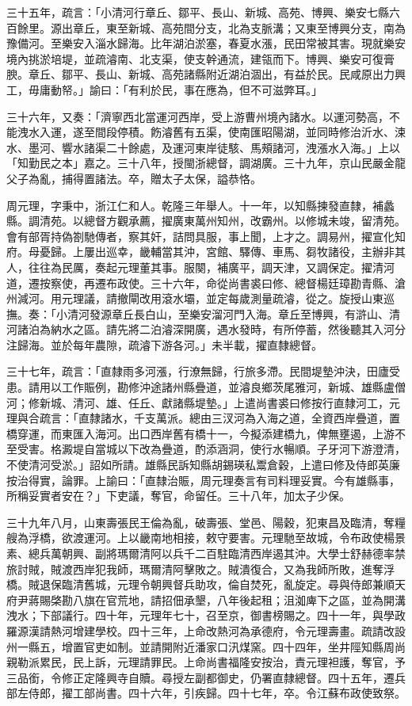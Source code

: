 \begin{pinyinscope}
三十五年，疏言：「小清河行章丘、鄒平、長山、新城、高苑、博興、樂安七縣六百餘里。源出章丘，東至新城、高苑間分支，北為支脈溝；又東至博興分支，南為豫備河。至樂安入淄水歸海。比年湖泊淤塞，春夏水漲，民田常被其害。現就樂安境內挑淤培堤，並疏濬南、北支渠，使支幹通流，建瓴而下。博興、樂安可復膏腴。章丘、鄒平、長山、新城、高苑諸縣附近湖泊涸出，有益於民。民咸原出力興工，毋庸動帑。」諭曰：「有利於民，事在應為，但不可滋弊耳。」

三十六年，又奏：「濟寧西北當運河西岸，受上游曹州境內諸水。以運河勢高，不能洩水入運，遂至間段停積。飭濬舊有五渠，使南匯昭陽湖，並同時修治沂水、涑水、墨河、響水諸渠二十餘處，及運河東岸徒駭、馬頰諸河，洩漲水入海。」上以「知勤民之本」嘉之。三十八年，授閩浙總督，調湖廣。三十九年，京山民嚴金龍父子為亂，捕得置諸法。卒，贈太子太保，謚恭恪。

周元理，字秉中，浙江仁和人。乾隆三年舉人。十一年，以知縣揀發直隸，補蠡縣。調清苑。以總督方觀承薦，擢廣東萬州知州，改霸州。以修城未竣，留清苑。會有部胥持偽劄馳傳者，察其奸，詰問具服，事上聞，上才之。調易州，擢宣化知府。母憂歸。上屢出巡幸，畿輔當其沖，宮館、驛傳、車馬、芻牧諸役，主辦非其人，往往為民厲，奏起元理董其事。服闋，補廣平，調天津，又調保定。擢清河道，遷按察使，再遷布政使。三十六年，命從尚書裘曰修、總督楊廷璋勘青縣、滄州減河。用元理議，請撤閘改用滾水壩，並定每歲測量疏濬，從之。旋授山東巡撫。奏：「小清河發源章丘長白山，至樂安溜河門入海。章丘至博興，有滸山、清河諸泊為納水之區。請先將二泊濬深開廣，遇水發時，有所停蓄，然後聽其入河分注歸海。並於每年農隙，疏濬下游各河。」未半載，擢直隸總督。

三十七年，疏言：「直隸雨多河漲，行潦無歸，行旅多滯。民間堤墊沖決，田廬受患。請用以工作賑例，勘修沖途諸州縣疊道，並濬良鄉茨尾雅河，新城、雄縣盧僧河；修新城、清河、雄、任丘、獻諸縣堤墊。」上遣尚書裘曰修按行直隸河工，元理與合疏言：「直隸諸水，千支萬派。總由三汊河為入海之道，全資西岸疊道，置橋穿運，而東匯入海河。出口西岸舊有橋十一，今擬添建橋九，俾無壅遏，上游不至受害。格澱堤自當城以下改為疊道，酌添涵洞，使行水暢順。子牙河下游澄清，不使清河受淤。」詔如所請。雄縣民訴知縣胡錫瑛私鬻倉穀，上遣曰修及侍郎英廉按治得實，論罪。上諭曰：「直隸治賑，周元理奏言有司料理妥實。今有雄縣事，所稱妥實者安在？」下吏議，奪官，命留任。三十八年，加太子少保。

三十九年八月，山東壽張民王倫為亂，破壽張、堂邑、陽穀，犯東昌及臨清，奪糧艘為浮橋，欲渡運河。上以畿南地相接，敕守要害。元理馳至故城，令布政使楊景素、總兵萬朝興、副將瑪爾清阿以兵千二百駐臨清西岸遏其沖。大學士舒赫德率禁旅討賊，賊渡西岸犯我師，瑪爾清阿擊敗之。賊潰復合，又為我師所敗，進奪浮橋。賊退保臨清舊城，元理令朝興督兵助攻，倫自焚死，亂旋定。尋與侍郎兼順天府尹蔣賜棨勘八旗在官荒地，請招佃承墾，八年後起租；沮洳庳下之區，並為開溝洩水；下部議行。四十年，元理年七十，召至京，御書榜賜之。四十一年，與學政羅源漢請熱河增建學校。四十三年，上命改熱河為承德府，令元理壽畫。疏請改設州一縣五，增置官吏如制。並請開附近潘家口汛煤窯。四十四年，坐井陘知縣周尚親勒派累民，民上訴，元理請罪民。上命尚書福隆安按治，責元理袒護，奪官，予三品銜，令修正定隆興寺自贖。尋授左副都御史，仍署直隸總督。四十五年，遷兵部左侍郎，擢工部尚書。四十六年，引疾歸。四十七年，卒。令江蘇布政使致祭。


\end{pinyinscope}
